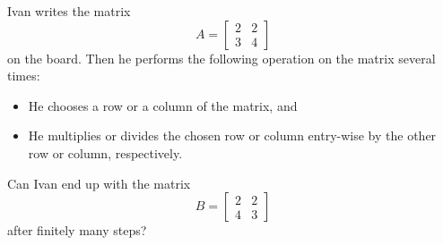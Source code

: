\begin{problem}
    Ivan writes the matrix
    \[
        A = \begin{bmatrix} 2 & 2 \\ 3 & 4 \end{bmatrix}
    \]
    on the board. Then he performs the following operation on the matrix several times:
    \begin{itemize}
        \item He chooses a row or a column of the matrix, and
        \item He multiplies or divides the chosen row or column entry-wise by the other row or column, respectively.
    \end{itemize}
    Can Ivan end up with the matrix
    \[
        B = \begin{bmatrix} 2 & 2 \\ 4 & 3 \end{bmatrix}
    \]
    after finitely many steps?
\end{problem}
